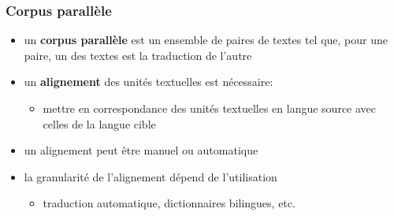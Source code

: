 \begin{frame}
\frametitle{Corpus parallèle}

\begin{itemize} \itemsep0.8em
    \item un \textbf{corpus parallèle} est un ensemble de paires de textes tel 
          que, pour une paire, un des textes est la traduction de l'autre
    \item un \textbf{alignement} des unités textuelles est nécessaire:
    \begin{itemize}
        \item mettre en correspondance des unités textuelles en langue source
              avec celles de la langue cible
    \end{itemize}
    \item un alignement peut être manuel ou automatique
    \item la granularité de l'alignement dépend de l'utilisation
    \begin{itemize}
        \item traduction automatique, dictionnaires bilingues, etc.
    \end{itemize}
\end{itemize}

\end{frame}

